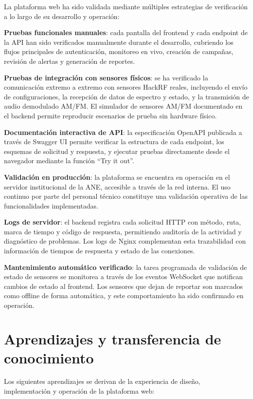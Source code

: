 La plataforma web ha sido validada mediante múltiples estrategias de
verificación a lo largo de su desarrollo y operación:

\textbf{Pruebas funcionales manuales}: cada pantalla del frontend y cada
endpoint de la API han sido verificados manualmente durante el desarrollo,
cubriendo los flujos principales de autenticación, monitoreo en vivo, creación
de campañas, revisión de alertas y generación de reportes.

\textbf{Pruebas de integración con sensores físicos}: se ha verificado la
comunicación extremo a extremo con sensores HackRF reales, incluyendo el envío
de configuraciones, la recepción de datos de espectro y estado, y la
transmisión de audio demodulado AM/FM. El simulador de sensores AM/FM
documentado en el backend permite reproducir escenarios de prueba sin hardware
físico.

\textbf{Documentación interactiva de API}: la especificación OpenAPI publicada
a través de Swagger UI permite verificar la estructura de cada endpoint, los
esquemas de solicitud y respuesta, y ejecutar pruebas directamente desde el
navegador mediante la función ``Try it out''.

\textbf{Validación en producción}: la plataforma se encuentra en operación en
el servidor institucional de la ANE, accesible a través de la red interna. El
uso continuo por parte del personal técnico constituye una validación
operativa de las funcionalidades implementadas.

\textbf{Logs de servidor}: el backend registra cada solicitud HTTP con método,
ruta, marca de tiempo y código de respuesta, permitiendo auditoría de la
actividad y diagnóstico de problemas. Los logs de Nginx complementan esta
trazabilidad con información de tiempos de respuesta y estado de las
conexiones.

\textbf{Mantenimiento automático verificado}: la tarea programada de
validación de estado de sensores se monitorea a través de los eventos
WebSocket que notifican cambios de estado al frontend. Los sensores que dejan
de reportar son marcados como offline de forma automática, y este
comportamiento ha sido confirmado en operación.

\section{Aprendizajes y transferencia de conocimiento}

Los siguientes aprendizajes se derivan de la experiencia de diseño,
implementación y operación de la plataforma web:


